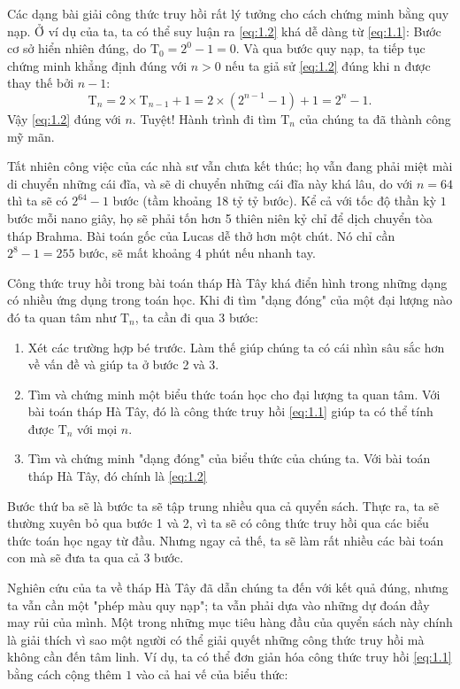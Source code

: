 Các dạng bài giải công thức truy hồi rất lý tưởng cho cách chứng minh bằng quy nạp. Ở ví dụ của ta, ta có thể suy luận ra \eqref{eq:1.2} khá dễ dàng từ \eqref{eq:1.1}: Bước cơ sở hiển nhiên đúng, do $\mathrm{T}_0 = 2^0 - 1 = 0$. Và qua bước quy nạp, ta tiếp tục chứng minh khẳng định đúng với $n > 0$ nếu ta giả sử \eqref{eq:1.2} đúng khi n được thay thế bởi $n - 1$:
$$\mathrm{T}_n = 2 \times \mathrm{T}_{n - 1}  + 1 = 2 \times (2^{n - 1} - 1) + 1 = 2^n - 1.$$
Vậy \eqref{eq:1.2} đúng với $n$. Tuyệt! Hành trình đi tìm $\mathrm{T}_n$ của chúng ta đã thành công mỹ mãn.

Tất nhiên công việc của các nhà sư vẫn chưa kết thúc; họ vẫn đang phải miệt mài di chuyển những cái đĩa, và sẽ di chuyển những cái đĩa này khá lâu, do với $n = 64$ thì ta sẽ có $2^64 - 1$ bước (tầm khoảng 18 tỷ tỷ bước). Kể cả với tốc độ thần kỳ $1$ bước mỗi nano giây, họ sẽ phải tốn hơn 5 thiên niên kỷ chỉ để dịch chuyển tòa tháp Brahma. Bài toán gốc của Lucas dễ thở hơn một chút. Nó chỉ cần $2 ^ 8 - 1 = 255$ bước, sẽ mất khoảng 4 phút nếu nhanh tay.

Công thức truy hồi trong bài toán tháp Hà Tây khá điển hình trong những dạng có nhiều ứng dụng trong toán học. Khi đi tìm "dạng đóng" của một đại lượng nào đó ta quan tâm như $\mathrm{T}_n$, ta cần đi qua 3 bước:
\begin{enumerate}
    \item Xét các trường hợp bé trước. Làm thế giúp chúng ta có cái nhìn sâu sắc hơn về vấn đề và giúp ta ở bước 2 và 3.
    \item Tìm và chứng minh 
    một biểu thức toán học cho đại lượng ta quan tâm. Với bài toán tháp Hà Tây, đó là công thức truy hồi \eqref{eq:1.1} giúp ta có thể tính được $\mathrm{T}_n$ với mọi $n$.
    \item Tìm và chứng minh "dạng đóng" của biểu thức của chúng ta. Với bài toán tháp Hà Tây, đó chính là \eqref{eq:1.2}
\end{enumerate}
Bước thứ ba sẽ là bước ta sẽ tập trung nhiều qua cả quyển sách. Thực ra, ta sẽ thường xuyên bỏ qua bước 1 và 2, vì ta sẽ có công thức truy hồi qua các biểu thức toán học ngay từ đầu. Nhưng ngay cả thế, ta sẽ làm rất nhiều các bài toán con mà sẽ đưa ta qua cả 3 bước.

Nghiên cứu của ta về tháp Hà Tây đã dẫn chúng ta đến với kết quả đúng, nhưng ta vẫn cần một "phép màu quy nạp"; ta vẫn phải dựa vào những dự đoán đầy may rủi của mình. Một trong những mục tiêu hàng đầu của quyển sách này chính là giải thích vì sao một người có thể giải quyết những công thức truy hồi mà không cần đến tâm linh. Ví dụ, ta có thể đơn giản hóa công thức truy hồi \eqref{eq:1.1} bằng cách cộng thêm $1$ vào cả hai vế của biểu thức:

